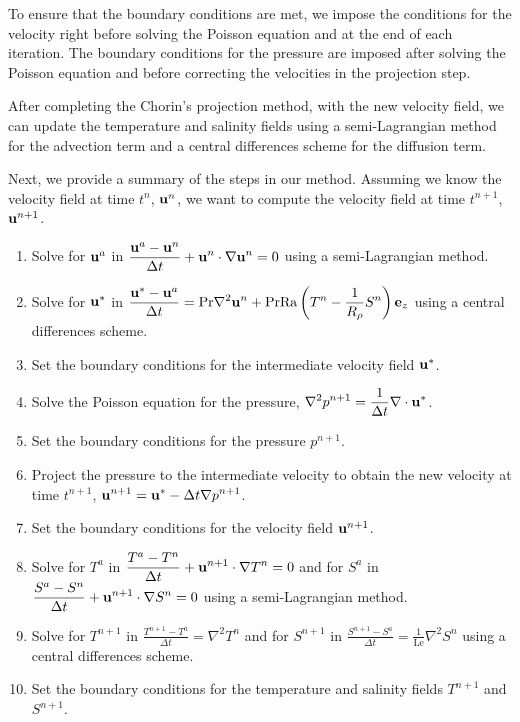 \documentclass{article}
\def\Ra{\mathrm{Ra}}
\def\Pr{\mathrm{Pr}}
\def\Le{\mathrm{Le}}
\begin{document}
To ensure that the boundary conditions are met, we impose the conditions for the velocity right before solving the Poisson equation and at the end of each iteration. The boundary conditions for the pressure are imposed after solving the Poisson equation and before correcting the velocities in the projection step.

After completing the Chorin's projection method, with the new velocity field, we can update the temperature and salinity fields using a semi-Lagrangian method for the advection term and a central differences scheme for the diffusion term.

Next, we provide a summary of the steps in our method. Assuming we know the velocity field at time $t^n$, $\boldsymbol{\mathrm{u}}^n$, we want to compute the velocity field at time $t^{n+1}$, $\boldsymbol{\mathrm{u}}^{n+1}$.
\begin{enumerate}
  \item Solve for $\boldsymbol{\mathrm{u}}^a$ in $\displaystyle  \frac{\boldsymbol{\mathrm{u}}^a-\boldsymbol{\mathrm{u}}^n}{\Delta t} + \boldsymbol{\mathrm{u}}^n \cdot \nabla \boldsymbol{\mathrm{u}}^n = 0$ using a semi-Lagrangian method.
  \item Solve for $\boldsymbol{\mathrm{u}}^*$ in $\displaystyle  \frac{\vf{u}^* - \vf{u}^a}{\Delta t} = \Pr \nabla^2 \vf{u}^n +\Pr\Ra\left(T^n - \frac{1}{R_{\rho}}S^n\right)\vf{e}_z$ using a central differences scheme.
  \item Set the boundary conditions for the intermediate velocity field $\boldsymbol{\mathrm{u}}^*$.
  \item Solve the Poisson equation for the pressure, $\displaystyle \nabla^2 p^{n+1} = \frac{1}{\Delta t}\nabla \cdot \boldsymbol{\mathrm{u}}^*$.
  \item Set the boundary conditions for the pressure $p^{n+1}$.
  \item Project the pressure to the intermediate velocity to obtain the new velocity at time $t^{n+1}$, $\displaystyle \boldsymbol{\mathrm{u}}^{n+1} = \boldsymbol{\mathrm{u}}^* - \Delta t\nabla p^{n+1}$.
  \item Set the boundary conditions for the velocity field $\boldsymbol{\mathrm{u}}^{n+1}$.
  \item Solve for $T^{a}$ in $\displaystyle  \frac{T^{a}-T^{n}}{\Delta t} + \boldsymbol{\mathrm{u}}^{n+1} \cdot \nabla T^{n} = 0$ and for $S^{a}$ in $\displaystyle  \frac{S^{a}-S^{n}}{\Delta t} + \boldsymbol{\mathrm{u}}^{n+1} \cdot \nabla S^{n} = 0$ using a semi-Lagrangian method.
  \item Solve for $T^{n+1}$ in $\displaystyle  \frac{T^{n+1}-T^{a}}{\Delta t} = \nabla^2 T^{n}$ and for $S^{n+1}$ in $\displaystyle  \frac{S^{n+1}-S^{a}}{\Delta t} = \frac{1}{\Le}\nabla^2 S^{n}$ using a central differences scheme.
  \item Set the boundary conditions for the temperature and salinity fields $T^{n+1}$ and $S^{n+1}$.
\end{enumerate}
\end{document}
